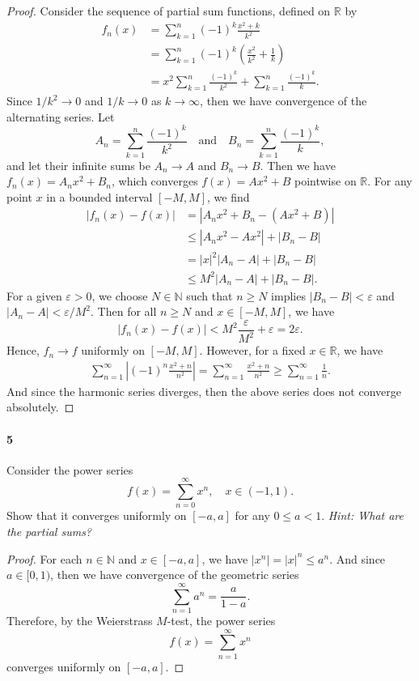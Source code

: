\documentclass[12pt]{article}
\newenvironment{fullbox}{\begin{lrbox}{\savefullbox}\begin{minipage}{\dimexpr\textwidth-2\fboxsep\relax}}{\end{minipage}\end{lrbox}\begin{center}\framebox[\textwidth]{\usebox{\savefullbox}}\end{center}}
\newenvironment{pbox}[1][]{\begin{fullbox}\ifx#1\empty\else\paragraph{#1}\fi}{\end{fullbox}}
\theoremstyle{definition}
\newcommand{\isp}[1]{\quad\text{#1}\quad}
\newcommand{\N}{\mathbb{N}}
\newcommand{\R}{\mathbb{R}}
\newcommand{\eps}{\varepsilon}
\begin{document}
\begin{proof}
    Consider the sequence of partial sum functions, defined on $\R$ by
    \begin{align*}
        f_n(x)
            &= \sum_{k=1}^{n} (-1)^k \frac{x^2+k}{k^2} \\
            &= \sum_{k=1}^{n} (-1)^k \left(\frac{x^2}{k^2} + \frac{1}{k}\right) \\
            &= x^2\sum_{k=1}^{n} \frac{(-1)^k}{k^2} + \sum_{k=1}^{n}\frac{(-1)^k}{k}.
    \end{align*}
    Since $1/k^2 \to 0$ and $1/k \to 0$ as $k \to \infty$, then we have convergence of the alternating series. Let
    \[
        A_n = \sum_{k=1}^{n} \frac{(-1)^k}{k^2}
        \isp{and}
        B_n = \sum_{k=1}^{n}\frac{(-1)^k}{k},
    \]
    and let their infinite sums be $A_n \to A$ and $B_n \to B$. Then we have $f_n(x) = A_n x^2 + B_n$, which converges $f(x) = Ax^2 + B$ pointwise on $\R$. For any point $x$ in a bounded interval $[-M, M]$, we find
    \begin{align*}
        |f_n(x) - f(x)|
            &= |A_nx^2 + B_n - (Ax^2 + B)| \\
            &\leq |A_nx^2 - Ax^2| + |B_n - B| \\
            &= |x|^2|A_n - A| + |B_n - B| \\
            &\leq M^2|A_n - A| + |B_n - B|.
    \end{align*}
    For a given $\eps > 0$, we choose $N \in \N$ such that $n \geq N$ implies $|B_n - B| < \eps$ and $|A_n - A| < \eps/M^2$. Then for all $n \geq N$ and $x \in [-M, M]$, we have
    \[
        |f_n(x) - f(x)|
            < M^2\frac{\eps}{M^2} + \eps
            = 2\eps.
    \]
    Hence, $f_n \to f$ uniformly on $[-M, M]$. However, for a fixed $x \in \R$, we have
    \begin{align*}
        \sum_{n=1}^\infty \left|(-1)^n \frac{x^2+n}{n^2}\right|
            = \sum_{n=1}^\infty \frac{x^2+n}{n^2}
            \geq \sum_{n=1}^{\infty} \frac{1}{n}.
    \end{align*}
    And since the harmonic series diverges, then the above series does not converge absolutely.
    
\end{proof}


\begin{pbox}[5]
    Consider the power series 
    \begin{equation}
    f(x) = \sum_{n=0}^\infty x^n,\quad x\in (-1,1).
    \end{equation}
    Show that it converges uniformly on $[-a,a]$ for any $0\le a <1$. {\it Hint: What are the partial sums?}
\end{pbox}

\begin{proof}
    For each $n \in \N$ and $x \in [-a, a]$, we have $|x^n| = |x|^n \leq a^n$. And since $a \in [0, 1)$, then we have convergence of the geometric series
    \[
        \sum_{n=1}^{\infty} a^n = \frac{a}{1 - a}.
    \]
    Therefore, by the Weierstrass $M$-test, the power series
    \[
        f(x) = \sum_{n=1}^\infty x^n
    \]
    converges uniformly on $[-a, a]$.
    
\end{proof}
\end{document}
